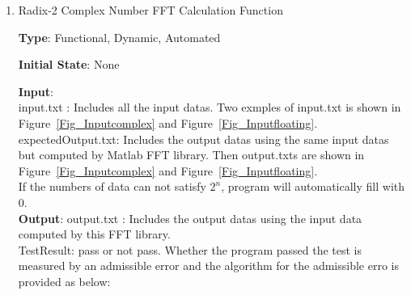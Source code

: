 \documentclass[12pt, titlepage]{article}
\begin{document}
\begin{enumerate}

\item{Radix-2 Complex Number FFT Calculation Function\\}

\textbf {Type}: Functional, Dynamic, Automated
					
\textbf {Initial State}: None
					
\textbf {Input}:\\ input.txt :  Includes all the input datas. Two exmples of input.txt is shown in Figure~\ref{Fig_Inputcomplex} and Figure~\ref{Fig_Inputfloating}.\\ 
 expectedOutput.txt:  Includes the output datas using the same input datas but computed by Matlab FFT library. Then output.txts  are shown in Figure~\ref{Fig_Inputcomplex} and Figure~\ref{Fig_Inputfloating}. \\ 
If the numbers of data can not satisfy $2^n$, program will automatically fill with 0.\\
					
\textbf {Output}:  output.txt : Includes the output datas using the input data computed by this FFT library.\\
TestResult: pass or not pass. Whether the program passed the test is measured by an admissible error and the algorithm for the admissible erro is provided as below:\\




\end{enumerate}
\end{document}
